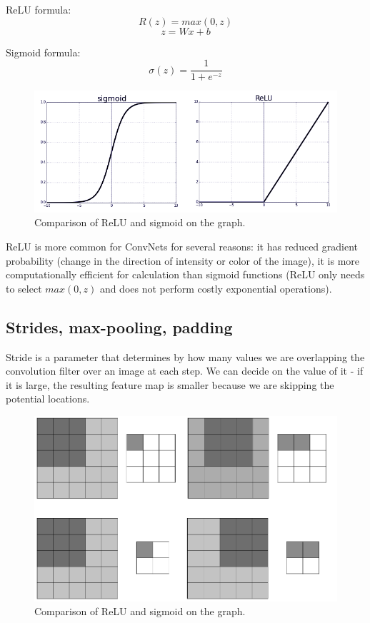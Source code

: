 \documentclass[conference]{IEEEtran}
\begin{document}
ReLU formula:
$$R(z)=max(0, z)$$
$$z=Wx + b$$

Sigmoid formula:
$$\sigma\left(z\right)=\frac{1}{1+e^{-z}}$$

\begin{figure}[hbt!]
 \centering
    \includegraphics[scale=0.45]{act_graph.png}
	    \caption{Comparison of ReLU and sigmoid on the graph.}
	    \label{fig:my_label}
\end{figure}

ReLU is more common for ConvNets for several reasons: it has reduced gradient probability (change in the direction of intensity or color of the image), it is more computationally efficient for calculation than sigmoid functions (ReLU only needs to select $max(0, z)$ and does not perform costly exponential operations).

\subsection{Strides, max-pooling, padding}
Stride is a parameter that determines by how many values we are overlapping the convolution filter over an image at each step. We can decide on the value of it - if it is large, the resulting feature map is smaller because we are skipping the potential locations.

\begin{figure}[hbt!]
 \centering
    \includegraphics[scale=0.36]{stride_comparison-b.png}
	    \caption{Comparison of ReLU and sigmoid on the graph.}
	    \label{fig:my_label}
\end{figure}
\end{document}
